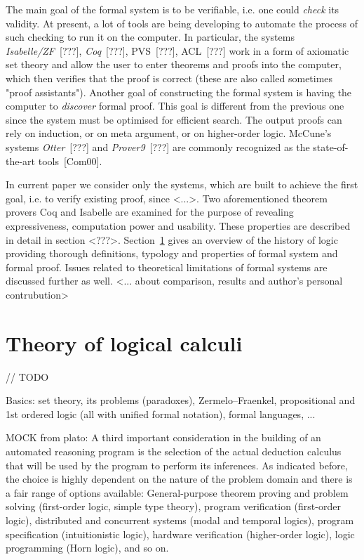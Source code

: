 \documentclass[article]{aaltoseries}
\begin{document}
The main goal of the formal system is to be verifiable, i.e. one could \textit{check} its validity. At present, a lot of tools are being developing to automate the process of such checking to run it on the computer. In particular, the systems \textit{Isabelle/ZF}~[???], \textit{Coq}~[???], PVS~[???], ACL~[???] work in a form of axiomatic set theory and allow the user to enter theorems and proofs into the computer, which then verifies that the proof is correct (these are also called sometimes "proof assistants").
Another goal of constructing the formal system is having the computer to \textit{discover} formal proof. This goal is different from the previous one since the system must be optimised for efficient search. The output proofs can rely on induction, or on meta argument, or on higher-order logic. McCune’s systems \textit{Otter}~[???] and \textit{Prover9}~[???] are commonly recognized as the state-of-the-art tools~[Com00].

In current paper we consider only the systems, which are built to achieve the first goal, i.e. to verify existing proof, since <...>. Two aforementioned theorem provers Coq and Isabelle are examined for the purpose of revealing expressiveness, computation power and usability. These properties are described in detail in section <???>. Section~\ref{sec:formal_theory} gives an overview of the history of logic providing thorough definitions, typology and properties of formal system and formal proof. Issues related to theoretical limitations of formal systems are discussed further as well. <... about comparison, results and author's personal contrubution>


\section{Theory of logical calculi}
\label{sec:formal_theory}
// TODO

Basics: set theory, its problems (paradoxes), Zermelo–Fraenkel, propositional and 1st ordered logic (all with unified formal notation), formal languages, ...


MOCK from plato: %
A third important consideration in the building of an automated reasoning program is the selection of the actual deduction calculus that will be used by the program to perform its inferences. As indicated before, the choice is highly dependent on the nature of the problem domain and there is a fair range of options available: General-purpose theorem proving and problem solving (first-order logic, simple type theory), program verification (first-order logic), distributed and concurrent systems (modal and temporal logics), program specification (intuitionistic logic), hardware verification (higher-order logic), logic programming (Horn logic), and so on.
\end{document}
